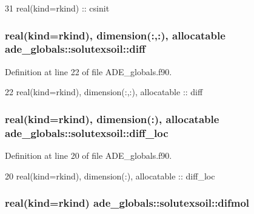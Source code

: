 \begin{DoxyCode}
31     \textcolor{keywordtype}{real(kind=rkind)} :: csinit
\end{DoxyCode}
\subsubsection[{diff}]{\setlength{\rightskip}{0pt plus 5cm}real(kind=rkind), dimension(\+:,\+:), allocatable ade\+\_\+globals\+::solutexsoil\+::diff}\label{structade__globals_1_1solutexsoil_aaa5c074a8bc489ef36938e2c4912b6a4}


Definition at line 22 of file A\+D\+E\+\_\+globals.\+f90.


\begin{DoxyCode}
22     \textcolor{keywordtype}{real(kind=rkind)}, \textcolor{keywordtype}{dimension(:,:)}, \textcolor{keywordtype}{allocatable} :: diff
\end{DoxyCode}
\subsubsection[{diff\+\_\+loc}]{\setlength{\rightskip}{0pt plus 5cm}real(kind=rkind), dimension(\+:), allocatable ade\+\_\+globals\+::solutexsoil\+::diff\+\_\+loc}\label{structade__globals_1_1solutexsoil_a7c4475ed9d7a96cfd1e126eee33df28b}


Definition at line 20 of file A\+D\+E\+\_\+globals.\+f90.


\begin{DoxyCode}
20     \textcolor{keywordtype}{real(kind=rkind)}, \textcolor{keywordtype}{dimension(:)}, \textcolor{keywordtype}{allocatable} :: diff\_loc
\end{DoxyCode}
\subsubsection[{difmol}]{\setlength{\rightskip}{0pt plus 5cm}real(kind=rkind) ade\+\_\+globals\+::solutexsoil\+::difmol}\label{structade__globals_1_1solutexsoil_ae7366521555df9391ae6eb7e0d42e875}


